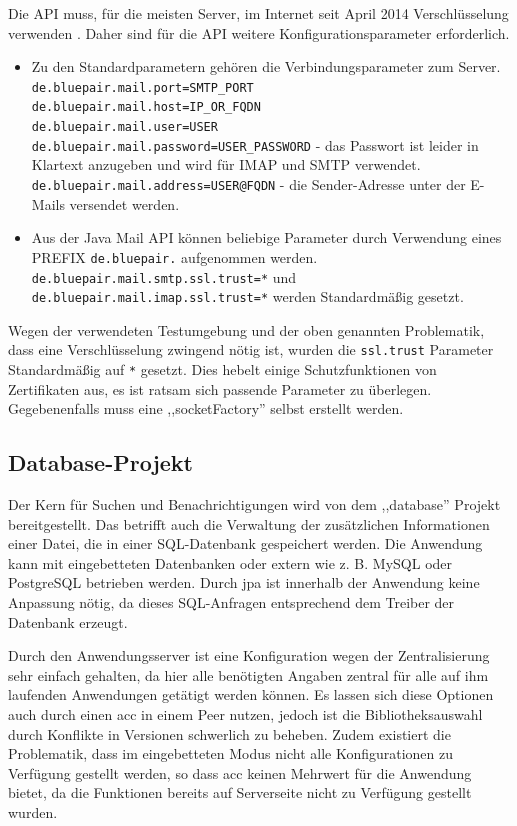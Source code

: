 \documentclass[oneside, ngerman, toc=bibliography,bibliography=totoc,listof=entryprefix, open=right,numbers=noenddot,fontsize=12pt]{scrbook}
\begin{document}
Die API muss, für die meisten Server, im Internet seit April 2014 Verschlüsselung verwenden \cite{sslmail}. Daher sind für die API weitere Konfigurationsparameter erforderlich.
\label{javamailc}
\begin{itemize}
    \item Zu den Standardparametern gehören die Verbindungsparameter zum Server.\\
    \verb|de.bluepair.mail.port=SMTP_PORT|\\
    \verb|de.bluepair.mail.host=IP_OR_FQDN|\\
    \verb|de.bluepair.mail.user=USER|\\ \verb|de.bluepair.mail.password=USER_PASSWORD| - das Passwort ist leider in Klartext anzugeben und wird für IMAP und SMTP verwendet. \\
    \verb|de.bluepair.mail.address=USER@FQDN| - die Sender-Adresse unter der E-Mails versendet werden. 
    \item Aus der Java Mail API können beliebige Parameter  durch Verwendung eines PREFIX \verb|de.bluepair.| aufgenommen werden.
    \verb|de.bluepair.mail.smtp.ssl.trust=*| und\\
    \verb|de.bluepair.mail.imap.ssl.trust=*| werden Standardmäßig gesetzt.
    
\end{itemize}

Wegen der verwendeten Testumgebung und der oben genannten Problematik, dass eine Verschlüsselung zwingend nötig ist, wurden die \verb|ssl.trust| Parameter Standardmäßig auf \verb|*| gesetzt. Dies hebelt einige Schutzfunktionen von Zertifikaten aus, es ist ratsam sich passende Parameter zu überlegen. Gegebenenfalls muss eine ,,socketFactory'' selbst erstellt werden. 

\subsection{Database-Projekt}

Der Kern für Suchen und Benachrichtigungen wird von dem ,,database'' Projekt bereitgestellt.
Das betrifft auch die Verwaltung der zusätzlichen Informationen einer Datei, die in einer SQL-Datenbank gespeichert werden. 
Die Anwendung kann mit eingebetteten Datenbanken oder extern wie z. B. {MySQL} oder {PostgreSQL} betrieben werden.
Durch \acrshort{jpa} ist innerhalb der Anwendung keine Anpassung nötig, da dieses SQL-Anfragen entsprechend dem Treiber der Datenbank erzeugt.

Durch den Anwendungsserver ist eine Konfiguration wegen der Zentralisierung sehr einfach gehalten, da hier alle benötigten Angaben zentral für alle auf ihm laufenden Anwendungen getätigt werden können. Es lassen sich diese Optionen auch durch einen \acrfull{acc} in einem Peer nutzen, jedoch ist die Bibliotheksauswahl durch Konflikte in Versionen schwerlich zu beheben. Zudem existiert die Problematik, dass im eingebetteten Modus nicht alle Konfigurationen zu Verfügung gestellt werden, so dass \acrshort{acc} keinen Mehrwert für die Anwendung bietet, da die Funktionen bereits auf Serverseite nicht zu Verfügung gestellt wurden.
\end{document}
